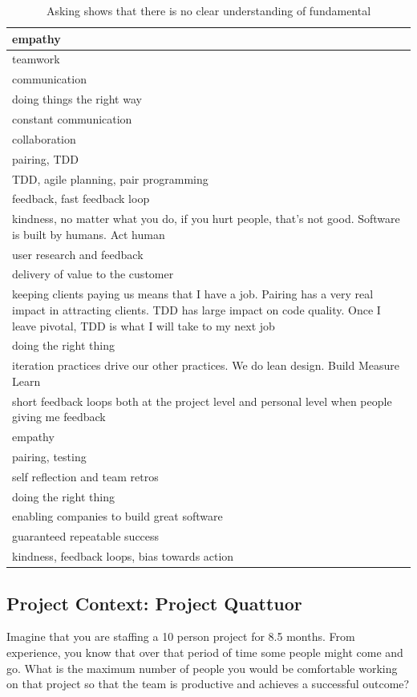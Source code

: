 \begin{table}[t]
\renewcommand{\arraystretch}{1.3}
\centering
\caption{Asking  shows that there is no clear understanding of fundamental}
\label{CorePractice}
\begin{tabular}{|p{3.10in}|}
\hline
empathy \\ \hline
teamwork \\ \hline
communication \\ \hline
doing things the right way \\ \hline
constant communication \\ \hline
collaboration \\ \hline
pairing, TDD \\ \hline
TDD, agile planning, pair programming \\ \hline
feedback, fast feedback loop \\ \hline
kindness, no matter what you do, if you hurt people, that's not good. Software is built by humans. Act human \\ \hline
user research and feedback \\ \hline
delivery of value to the customer \\ \hline
keeping clients paying us means that I have a job. Pairing has a very real impact in attracting clients. TDD has large impact on code quality. Once I leave pivotal, TDD is what I will take to my next job \\ \hline
doing the right thing \\ \hline
iteration practices drive our other practices. We do lean design. Build Measure Learn \\ \hline
short feedback loops both at the project level and personal level when people giving me feedback \\ \hline
empathy \\ \hline
pairing, testing \\ \hline
self reflection and  team retros \\ \hline
doing the right thing \\ \hline
enabling companies to build great software \\ \hline
guaranteed repeatable success \\ \hline
kindness, feedback loops, bias towards action \\
\hline
\end{tabular}
\end{table}

\subsection{Project Context: Project Quattuor}
\label{ExampleInAction}
Imagine that you are staffing a 10 person project for 8.5 months. From experience, you know that over that period of time some people might come and go. What is the maximum number of people you would be comfortable working on that project so that the team is productive and achieves a successful outcome?  


